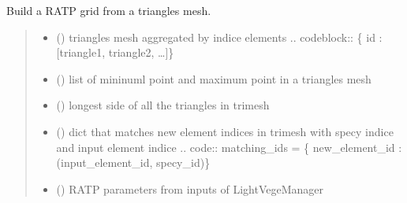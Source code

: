 \documentclass[letterpaper,10pt,english]{sphinxmanual}
\begin{document}
\begin{fulllineitems}
\label{\detokenize{reference:buildRATPscene.build_RATPscene_from_trimesh}}
\pysigstartsignatures
{}
\pysigstopsignatures
\sphinxAtStartPar
Build a RATP grid from a triangles mesh.
\begin{quote}\begin{description}
\begin{itemize}
\item {} 
\sphinxAtStartPar
{} () \textendash{} triangles mesh aggregated by indice elements
.. code\sphinxhyphen{}block:: \{ id : {[}triangle1, triangle2, …{]}\}

\item {} 
\sphinxAtStartPar
{} (\sphinxstyleliteralemphasis{\sphinxupquote{{[}}}\sphinxstyleliteralemphasis{\sphinxupquote{, }}\sphinxstyleliteralemphasis{\sphinxupquote{{]}}}) \textendash{} list of mininuml point and maximum point in a triangles mesh

\item {} 
\sphinxAtStartPar
{} () \textendash{} longest side of all the triangles in trimesh

\item {} 
\sphinxAtStartPar
{} () \textendash{} dict that matches new element indices in trimesh with specy indice and
input element indice
.. code:: matching\_ids = \{ new\_element\_id : (input\_element\_id, specy\_id)\}

\item {} 
\sphinxAtStartPar
{} () \textendash{} RATP parameters from inputs of LightVegeManager


\end{itemize}
\end{description}
\end{quote}
\end{fulllineitems}
\end{document}
